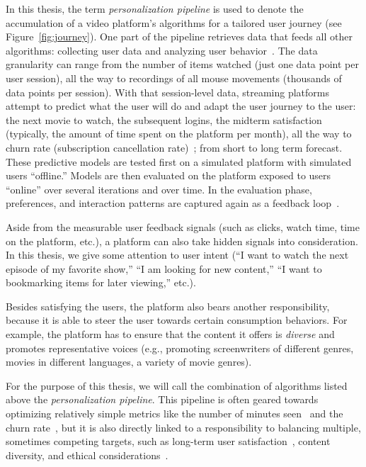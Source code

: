 In this thesis, the term \emph{personalization pipeline} is used to denote the accumulation of a video platform's algorithms for a tailored user journey (see Figure~\ref{fig:journey}). 
One part of the pipeline retrieves data that feeds all other algorithms: collecting user data and analyzing user behavior~\cite{behaviorals}.
The data granularity can range from the number of items watched (just one data point per user session), all the way to recordings of all mouse movements (thousands of data points per session). With that session-level data, streaming platforms attempt to predict what the user will do and adapt the user journey to the user: the next movie to watch, the subsequent logins, the midterm satisfaction (typically, the amount of time spent on the platform per month), all the way to churn rate (subscription cancellation rate)~\cite{longTerm}; from short to long term forecast. These predictive models are tested first on a simulated platform with simulated users ``offline.'' 
Models are then evaluated on the platform exposed to users ``online'' over several iterations and over time. In the evaluation phase, preferences, and interaction patterns are captured again as a feedback loop~\cite{offlineOnlineSurvey, NetflixReco}. 

Aside from the measurable user feedback signals (such as clicks, watch time, time on the platform, etc.), a platform can also take hidden signals into consideration. In this thesis, we give some attention to user intent (``I want to watch the next episode of my favorite show,'' ``I am looking for new content,'' ``I want to bookmarking items for later viewing,'' etc.). 

Besides satisfying the users, the platform also bears another responsibility, because it is able to steer the user towards certain consumption behaviors. For example, the platform has to ensure that the content it offers is \emph{diverse} and promotes representative voices (e.g., promoting screenwriters of different genres, movies in different languages, a variety of movie genres). %

For the purpose of this thesis, we will call the combination of algorithms listed above the \emph{personalization pipeline}. 
This pipeline is often geared towards optimizing relatively simple metrics like the number of minutes seen~\cite{spotifyIntent} and the churn rate~\cite{oldChurn}, but it is also directly linked to a responsibility to balancing multiple, sometimes competing targets, such as long-term user satisfaction~\cite{longTerm}, content diversity, and  ethical considerations~\cite{helberger}.

